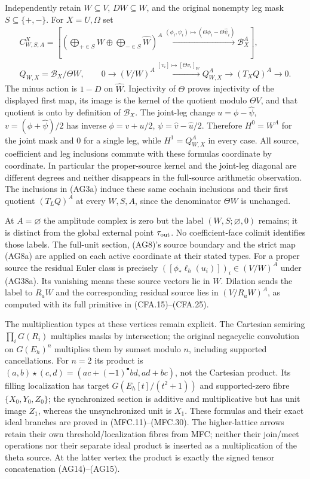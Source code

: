 Independently retain $W\subseteq V$, $D W\subseteq W$, and the original
nonempty leg mask $S\subseteq\{+,-\}$. For $X=U,\Omega$ set
\[
\begin{gathered}
 C^X_{W,S;A}=
 \left[\left(\bigoplus_{+\in S}W\oplus
                  \bigoplus_{-\in S}\widehat W\right)^A
          \xrightarrow{(\phi_i,\psi_i)\mapsto
                  (\Theta\phi_i-\Theta\widehat\psi_i)}
                         \mathscr B_X^A\right],\\
 Q_{W,X}=\mathscr B_X/\Theta W,\qquad
 0\to(V/W)^A\xrightarrow{[v_i]\mapsto[\Theta v_i]_W}
 Q_{W,X}^A\to(T_XQ)^A\to0 .
\end{gathered}                                                   \tag{AG38a}
\]
The minus action is $1-D$ on $\widehat W$. Injectivity of $\Theta$
proves injectivity of the displayed first map, its image is the kernel
of the quotient modulo $\Theta V$, and that quotient is onto by
definition of $\mathscr B_X$. The joint-leg change
$u=\phi-\widehat\psi$, $v=(\phi+\widehat\psi)/2$ has inverse
$\phi=v+u/2$, $\psi=\widehat v-\widehat u/2$. Therefore
$H^0=W^A$ for the joint mask and $0$ for a single leg, while
$H^1=Q_{W,X}^A$ in every case. All source, coefficient and leg
inclusions commute with these formulas coordinate by coordinate.
In particular the proper-source kernel and the joint-leg diagonal
are different degrees and neither disappears in the full-source
arithmetic observation. The inclusions in (AG3a) induce these same
cochain inclusions and their first quotient $(T_LQ)^A$ at every
$W,S,A$, since the denominator $\Theta W$ is unchanged.

At $A=\varnothing$ the amplitude complex is zero but the label
$(W,S;\varnothing,0)$ remains; it is distinct from the global external
point $\tau_{\rm out}$. No coefficient-face colimit identifies those
labels. The full-unit section, (AG8)'s source boundary and the strict
map (AG8a) are applied on each active coordinate at their stated types.
For a proper source the residual Euler class is precisely
$([\phi_*\ell_h(u_i)])_i\in(V/W)^A$ under (AG38a). Its vanishing
means these source vectors lie in $W$. Dilation sends the label to
$R_aW$ and the corresponding residual source lies in $(V/R_aW)^A$,
as computed with its full primitive in (CFA.15)--(CFA.25).

The multiplication types at these vertices remain explicit. The
Cartesian semiring $\prod_iG(R_i)$ multiplies masks by intersection;
the original negacyclic convolution on $G(E_h)^n$ multiplies them by
sumset modulo $n$, including supported cancellations. For $n=2$ its
product is $(a,b)\star(c,d)=(ac+(-1)^\bullet bd,ad+bc)$, not the
Cartesian product. Its filling localization has target
$G(E_h[t]/(t^2+1))$ and supported-zero fibre $\{X_0,Y_0,Z_0\}$;
the synchronized section is additive and multiplicative but has unit
image $Z_1$, whereas the unsynchronized unit is $X_1$. These formulas
and their exact ideal branches are proved in (MFC.11)--(MFC.30).
The higher-lattice arrows retain their own threshold/localization
fibres from MFC; neither their join/meet operations nor their separate
ideal product is inserted as a multiplication of the theta source.
At the latter vertex the product is exactly the signed tensor
concatenation (AG14)--(AG15).

